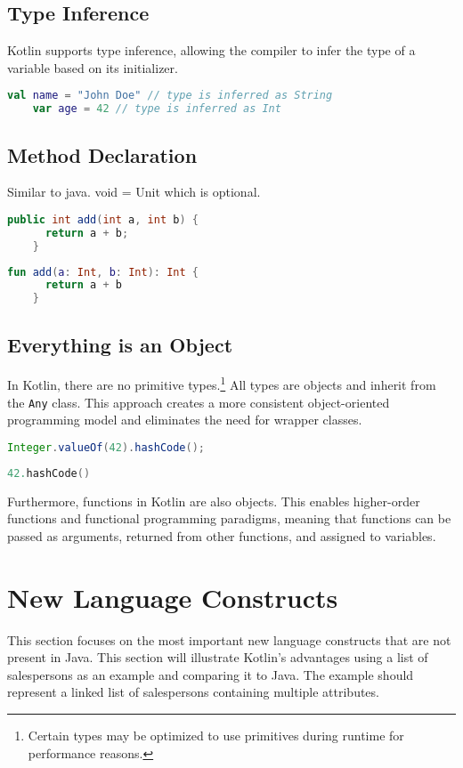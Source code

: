 \documentclass[a4paper, 11pt]{article}
\begin{document}
\subsection{Type Inference}
  Kotlin supports type inference, allowing the compiler to infer the type of a variable based on its initializer.
  \begin{lstlisting}[language=Kotlin]
    val name = "John Doe" // type is inferred as String
    var age = 42 // type is inferred as Int
  \end{lstlisting}

\subsection{Method Declaration}
  Similar to java. void = Unit which is optional.
  \begin{lstlisting}[language=Java,title={Java method declaration}]
    public int add(int a, int b) {
      return a + b;
    }
  \end{lstlisting}
  \begin{lstlisting}[language=Kotlin,title={Kotlin method declaration}]
    fun add(a: Int, b: Int): Int {
      return a + b
    }
  \end{lstlisting}

\subsection{Everything is an Object}
  In Kotlin, there are no primitive types.\footnote{Certain types may be optimized to use primitives during runtime for performance reasons.} All types are objects and inherit from the \texttt{Any} class.\cite{basic-types}
  This approach creates a more consistent object-oriented programming model and eliminates the need for wrapper classes.
  \begin{lstlisting}[language=Java,title={Java Integer Wrapper}]
    Integer.valueOf(42).hashCode();
  \end{lstlisting}
  \begin{lstlisting}[language=Kotlin,title={Kotlin direct usage of Int}]
    42.hashCode()
  \end{lstlisting}
  Furthermore, functions in Kotlin are also objects. This enables higher-order functions and functional programming paradigms, meaning that functions can be passed as arguments, returned from other functions, and assigned to variables.

\section{New Language Constructs} %
  This section focuses on the most important new language constructs that are not present in Java. 
  This section will illustrate Kotlin's advantages using a list of salespersons as an example and comparing it to Java.
  The example should represent a linked list of salespersons containing multiple attributes.
\end{document}
